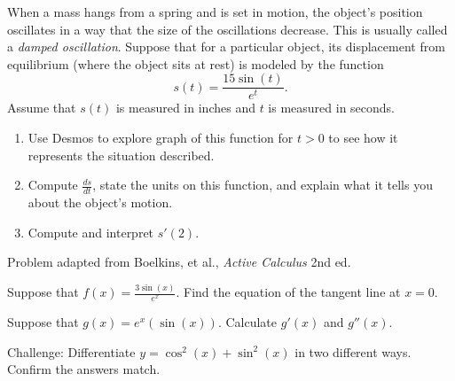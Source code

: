 \documentclass{ximera}
\begin{document}
\begin{exercise}
    When a mass hangs from a spring and is set in motion, the object's position oscillates in a way that the size of the oscillations decrease. This is usually called a \textit{damped oscillation}. Suppose that for a particular object, its displacement from equilibrium (where the object sits at rest) is modeled by the function \[s(t)=\frac{15\sin(t)}{e^t}.\]
    Assume that $s(t)$ is measured in inches and $t$ is measured in seconds. 
    \begin{enumerate} 
        \item Use Desmos to explore graph of this function for $t>0$ to see how it represents the situation described. \\
        \begin{center}
        \end{center}
        \item Compute $\frac{ds}{dt}$, state the units on this function, and explain what it tells you about the object's motion. 
        \item Compute and interpret $s'(2)$.
    \end{enumerate}
    Problem adapted from Boelkins, et al., \textit{Active Calculus} 2nd ed.
\end{exercise}

\begin{exercise}
    Suppose that $f(x)=\frac{3\sin(x)}{e^x}$.  Find the equation of the tangent line at $x=0.$
\end{exercise}

\begin{exercise}
    Suppose that $g(x)=e^x(\sin(x))$.  Calculate $g'(x)$ and $g''(x)$. 
\end{exercise}  
   

\begin{exercise}
    Challenge: Differentiate $y=\cos^2(x)+\sin^2(x)$ in two different ways.  Confirm the answers match.
\end{exercise}
\end{document}
